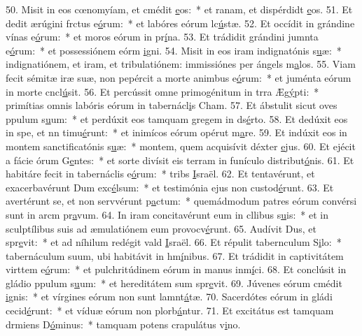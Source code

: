 50. Misit in eos cœnomyíam, et cmédit \uline{e}os:~* et ranam, et dispérdidt \uline{e}os.
51. Et dedit ærúgini frctus e\uline{ó}rum:~* et labóres eórum lc\uline{ú}stæ.
52. Et occídit in grándine vínas e\uline{ó}rum:~* et moros eórum in pr\uline{í}na.
53. Et trádidit grándini jumnta e\uline{ó}rum:~* et possessiónem eórm \uline{i}gni.
54. Misit in eos iram indignatónis s\uline{u}æ:~* indignatiónem, et iram, et tribulatiónem: immissiónes per ángels m\uline{a}los.
55. Viam fecit sémitæ iræ suæ, non pepércit a morte animbus e\uline{ó}rum:~* et juménta eórum in morte cncl\uline{ú}sit.
56. Et percússit omne primogénitum in trra Æg\uline{ý}pti:~* primítias omnis labóris eórum in tabernácl\uline{i}s Cham.
57. Et ábstulit sicut oves ppulum s\uline{u}um:~* et perdúxit eos tamquam gregem in ds\uline{é}rto.
58. Et dedúxit eos in spe, et nn timu\uline{é}runt:~* et inimícos eórum opérut m\uline{a}re.
59. Et indúxit eos in montem sanctificatónis s\uline{u}æ:~* montem, quem acquisívit déxter \uline{e}jus.
60. Et ejécit a fácie órum G\uline{e}ntes:~* et sorte divísit eis terram in funículo distribut\uline{ó}nis.
61. Et habitáre fecit in tabernáclis e\uline{ó}rum:~* tribs \uline{I}sraël.
62. Et tentavérunt, et exacerbavérunt Dum exc\uline{é}lsum:~* et testimónia ejus non custod\uline{é}runt.
63. Et avertérunt se, et non servvérunt p\uline{a}ctum:~* quemádmodum patres eórum convérsi sunt in arcm pr\uline{a}vum.
64. In iram concitavérunt eum in cllibus s\uline{u}is:~* et in sculptílibus suis ad æmulatiónem eum provocv\uline{é}runt.
65. Audívit Dus, et spr\uline{e}vit:~* et ad níhilum redégit vald \uline{I}sraël.
66. Et répulit tabernculum S\uline{i}lo:~* tabernáculum suum, ubi habitávit in hm\uline{í}nibus.
67. Et trádidit in captivitátem virttem e\uline{ó}rum:~* et pulchritúdinem eórum in manus inm\uline{í}ci.
68. Et conclúsit in gládio ppulum s\uline{u}um:~* et hereditátem sum spr\uline{e}vit.
69. Júvenes eórum cmédit \uline{i}gnis:~* et vírgines eórum non sunt lamnt\uline{á}tæ.
70. Sacerdótes eórum in gládi cecid\uline{é}runt:~* et víduæ eórum non plorb\uline{á}ntur.
71. Et excitátus est tamquam drmiens D\uline{ó}minus:~* tamquam potens crapulátus  v\uline{i}no.

